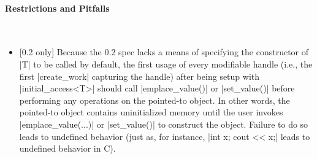 \paragraph{Restrictions and Pitfalls}\mbox{}\\ 
\begin{itemize}
  \item {\color{red}[0.2 only]} Because the 0.2 spec lacks a means of specifying
  the constructor of |T| to be called by default, the first usage of
  every modifiable handle (i.e., the first {|create_work|} capturing the
  handle) after being setup with |initial_access<T>| should call
  |emplace_value()| or |set_value()| before performing any
  operations on the pointed-to object.  In other words, the pointed-to object
  contains uninitialized memory until the user invokes 
  |emplace_value(...)| or |set_value()| to construct the object.
  Failure to do so leads to undefined behavior (just as, for instance,
  |int x; cout << x;| leads to undefined behavior in C). 
\end{itemize}




